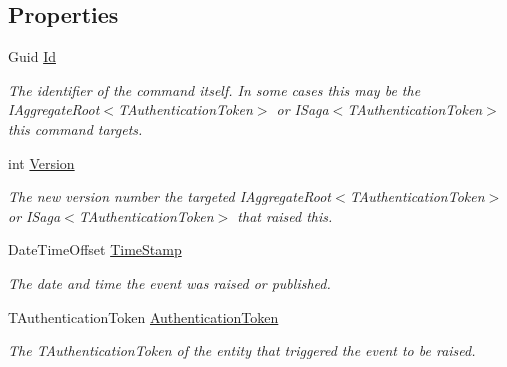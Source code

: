 \subsection*{Properties}
\begin{DoxyCompactItemize}
\item 
Guid \hyperlink{classCqrs_1_1Events_1_1DuplicateCreateCommandEvent_a6b837c04369ac127fc34f84799c3d70a_a6b837c04369ac127fc34f84799c3d70a}{Id}
\begin{DoxyCompactList}\small\item\em The identifier of the command itself. In some cases this may be the I\+Aggregate\+Root$<$\+T\+Authentication\+Token$>$ or I\+Saga$<$\+T\+Authentication\+Token$>$ this command targets. \end{DoxyCompactList}\item 
int \hyperlink{classCqrs_1_1Events_1_1DuplicateCreateCommandEvent_ad2d19f109697e676edf4ad7dc7b19bdd_ad2d19f109697e676edf4ad7dc7b19bdd}{Version}
\begin{DoxyCompactList}\small\item\em The new version number the targeted I\+Aggregate\+Root$<$\+T\+Authentication\+Token$>$ or I\+Saga$<$\+T\+Authentication\+Token$>$ that raised this. \end{DoxyCompactList}\item 
Date\+Time\+Offset \hyperlink{classCqrs_1_1Events_1_1DuplicateCreateCommandEvent_ae732d7442d4eed8329e39a500433c96c_ae732d7442d4eed8329e39a500433c96c}{Time\+Stamp}
\begin{DoxyCompactList}\small\item\em The date and time the event was raised or published. \end{DoxyCompactList}\item 
T\+Authentication\+Token \hyperlink{classCqrs_1_1Events_1_1DuplicateCreateCommandEvent_ab9737d0d029bb3f4b37d2a628ea98d04_ab9737d0d029bb3f4b37d2a628ea98d04}{Authentication\+Token}
\begin{DoxyCompactList}\small\item\em The {\itshape T\+Authentication\+Token}  of the entity that triggered the event to be raised. \end{DoxyCompactList}\item 

\end{DoxyCompactItemize}
